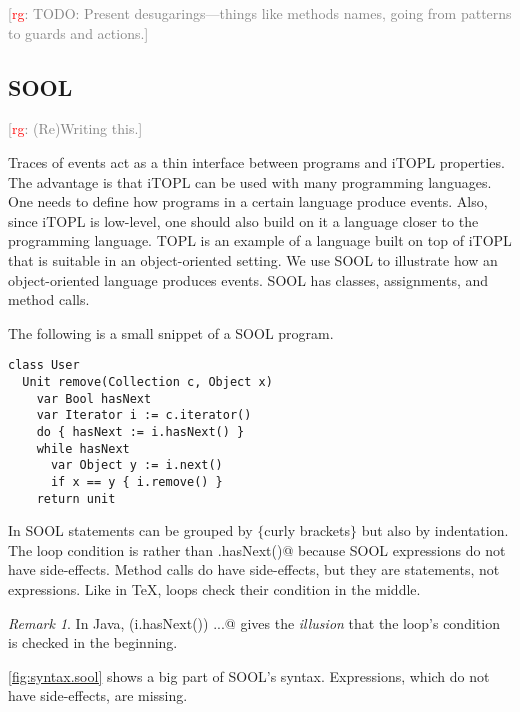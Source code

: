 \documentclass[preprint]{sigplanconf} %
\newcommand{\note}[2]{\textcolor{gray}{[\textcolor{red}{#1}: #2]}}
\newcommand{\rg}[1]{\note{rg}{#1}}
\newcommand{\delimitVerbatim}{\par\nobreak\smallskip\noindent}
\theoremstyle{definition}
\theoremstyle{remark}
\newtheorem{remark}{Remark}
\begin{document}
\rg{TODO: Present desugarings---things like methods names, going from patterns to guards and actions.}

\subsection{SOOL}\label{sec:syntax.sool} %

\rg{(Re)Writing this.}


Traces of events act as a thin interface between programs and iTOPL properties.
The advantage is that iTOPL can be used with many programming languages.
One needs to define how programs in a certain language produce events.
Also, since iTOPL is low-level, one should also build on it a language closer to the programming language.
TOPL is an example of a language built on top of iTOPL that is suitable in an object-oriented setting.
We use SOOL to illustrate how an object-oriented language produces events.
SOOL has classes, assignments, and method calls.

The following is a small snippet of a SOOL program.
\delimitVerbatim
\begin{Verbatim}
class User
  Unit remove(Collection c, Object x)
    var Bool hasNext
    var Iterator i := c.iterator()
    do { hasNext := i.hasNext() }
    while hasNext
      var Object y := i.next()
      if x == y { i.remove() }
    return unit
\end{Verbatim}
\delimitVerbatim
In SOOL statements can be grouped by $\{$curly brackets$\}$ but also by indentation.
The loop condition is \Verb@hasNext@ rather than \Verb@i.hasNext()@ because SOOL expressions do not have side-effects.
Method calls do have side-effects, but they are statements, not expressions.
Like in \TeX, loops check their condition in the middle.

\begin{remark}
In Java, \Verb@while (i.hasNext()) ...@ gives the \emph{illusion} that the loop's condition is checked in the beginning.
\end{remark}

\autoref{fig:syntax.sool} shows a big part of SOOL's syntax.
Expressions, which do not have side-effects, are missing.
\end{document}
